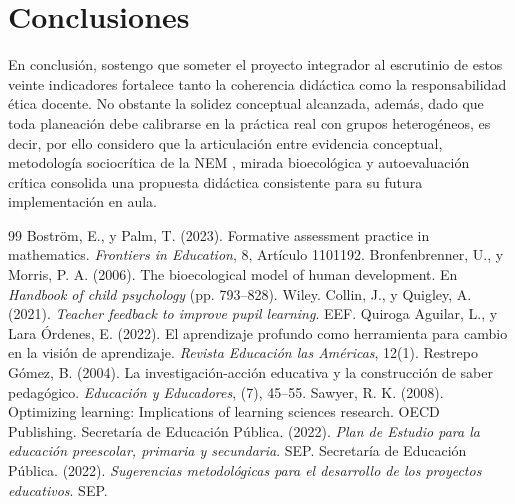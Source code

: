 \documentclass[spanish,letterpaper,oneside]{article}
\begin{document}
\clearpage
\section{Conclusiones}
En conclusión, sostengo que someter el proyecto integrador al escrutinio de estos veinte indicadores fortalece tanto la coherencia didáctica como la responsabilidad ética docente. No obstante la solidez conceptual alcanzada, además, dado que toda planeación debe calibrarse en la práctica real con grupos heterogéneos, es decir, por ello considero que la articulación entre evidencia conceptual, metodología sociocrítica de la NEM \citep{sep2022plan}, mirada bioecológica \citep{bronfenbrenner2006bioecologico} y autoevaluación crítica consolida una propuesta didáctica consistente para su futura implementación en aula.

\clearpage
\begin{thebibliography}{99}
 Boström, E., y Palm, T. (2023). Formative assessment practice in mathematics. \textit{Frontiers in Education}, 8, Artículo 1101192.
 Bronfenbrenner, U., y Morris, P. A. (2006). The bioecological model of human development. En \textit{Handbook of child psychology} (pp. 793--828). Wiley.
 Collin, J., y Quigley, A. (2021). \textit{Teacher feedback to improve pupil learning}. EEF.
 Quiroga Aguilar, L., y Lara Órdenes, E. (2022). El aprendizaje profundo como herramienta para cambio en la visión de aprendizaje. \textit{Revista Educación las Américas}, 12(1).
 Restrepo Gómez, B. (2004). La investigación-acción educativa y la construcción de saber pedagógico. \textit{Educación y Educadores}, (7), 45--55.
 Sawyer, R. K. (2008). Optimizing learning: Implications of learning sciences research. OECD Publishing.
 Secretaría de Educación Pública. (2022). \textit{Plan de Estudio para la educación preescolar, primaria y secundaria}. SEP.
 Secretaría de Educación Pública. (2022). \textit{Sugerencias metodológicas para el desarrollo de los proyectos educativos}. SEP.
\end{thebibliography}
\end{document}
